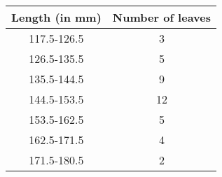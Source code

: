 \centering
\begin{tabular}{|c|c|}
\hline
    Length (in mm) & Number of leaves \\ \hline
    117.5-126.5 & 3 \\ \hline
    126.5-135.5 & 5 \\ \hline
    135.5-144.5 & 9 \\ \hline
    144.5-153.5 & 12 \\ \hline
    153.5-162.5 & 5 \\ \hline
    162.5-171.5 & 4 \\ \hline
    171.5-180.5 & 2 \\ \hline
\end{tabular}